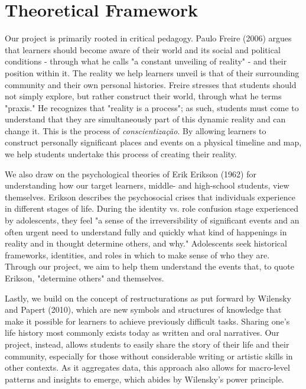 \documentclass{sigchi-ext}
\begin{document}
\section{Theoretical Framework}
Our project is primarily rooted in critical pedagogy. Paulo Freire (2006) argues that learners should become aware of their world and its social and political conditions - through what he calls "a constant unveiling of reality" - and their position within it. The reality we help learners unveil is that of their surrounding community and their own personal histories. Freire stresses that students should not simply explore, but rather construct their world, through what he terms "praxis." He recognizes that "reality is a process"; as such, students must come to understand that they are simultaneously part of this dynamic reality and can change it. This is the process of \textit{conscientiza\c{c}\~{a}o}. By allowing learners to construct personally significant places and events on a physical timeline and map, we help students undertake this process of creating their reality.

We also draw on the psychological theories of Erik Erikson (1962) for understanding how our target learners, middle- and high-school students, view themselves. Erikson describes the psychosocial crises that individuals experience in different stages of life. During the identity vs. role confusion stage experienced by adolescents, they feel "a sense of the irreversibility of significant events and an often urgent need to understand fully and quickly what kind of happenings in reality and in thought determine others, and why." Adolescents seek historical frameworks, identities, and roles in which to make sense of who they are. Through our project, we aim to help them understand the events that, to quote Erikson, "determine others" and themselves.

Lastly, we build on the concept of restructurations as put forward by Wilensky and Papert (2010), which are new symbols and structures of knowledge that make it possible for learners to achieve previously difficult tasks. Sharing one's life history most commonly exists today as written and oral narratives. Our project, instead, allows students to easily share the story of their life and their community, especially for those without considerable writing or artistic skills in other contexts. As it aggregates data, this approach also allows for macro-level patterns and insights to emerge, which abides by Wilensky's power principle.
\end{document}
